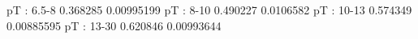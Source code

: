 pT : 6.5-8
0.368285 0.00995199
pT : 8-10
0.490227 0.0106582
pT : 10-13
0.574349 0.00885595
pT : 13-30
0.620846 0.00993644
